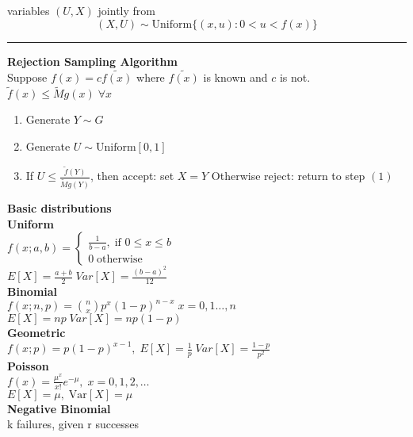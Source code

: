\documentclass[10pt]{article} %
\begin{document}
\begin{multicols}{4}
{\begin{center}
            variables \((U,X)\) jointly from
            \begin{equation*}
                (X,U) \sim \text{Uniform}\{(x,u): 0 < u < f(x)\}
            \end{equation*}
            \hrule
            \vspace{0.1cm}
            \textbf{Rejection Sampling Algorithm}\\
            Suppose \(f(x)= c \tilde{f(x)}\) where \(\tilde{f(x)}\) is
            known and \(c\) is not. \(\tilde{f}(x)\leq \tilde{M}g(x)\; \forall x\)
            \begin{enumerate}
                \item Generate \(Y\sim G\)
                \item Generate \(U \sim \text{Uniform}[0,1]\)
                \item If \(U \leq \frac{\tilde{f}(Y)}{\tilde{M}g(Y)}\), then accept: set \(X=Y\)
                      Otherwise reject: return to step \((1)\)
            \end{enumerate}
        \end{center}
    }
    \columnbreak
    \vbox{
    \textbf{Basic distributions}\\
    {\small \textbf{Uniform}}\\
    \(
    f(x;a,b) = \begin{cases}
        \frac{1}{b-a}, \; \text{if } 0\leq x \leq b \\
        0 \; \text{otherwise}
    \end{cases} \)\\
    \(
    E[X] = \frac{a+b}{2}\;Var[X] = \frac{(b-a)^2}{12}
    \)\\
    {\small \textbf{Binomial}}\\
    \(
    f(x;n,p) = \binom{n}{x} p^{x} (1-p)^{n-x}\; x=0,1\dots,n \)\\
    \(
    E[X] =np\; Var[X] = np(1-p)
    \)\\
    {\small \textbf{Geometric}}\\
    \(
    f(x;p)  = p(1-p)^{x-1},\; E[X] = \frac{1}{p}\;Var[X] = \frac{1-p}{p^2}
    \)\\
    {\small \textbf{Poisson}}\\
    \(
    f(x)= \frac{\mu^x}{x!}e^{-\mu},\; x = 0,1,2,\dots
    \)\\
    \(
    E[X] = \mu,\; \text{Var}[X] = \mu
    \)\\
    {\small \textbf{Negative Binomial}}\\
    k failures, given r successes\\
}
\end{multicols}
\end{document}
